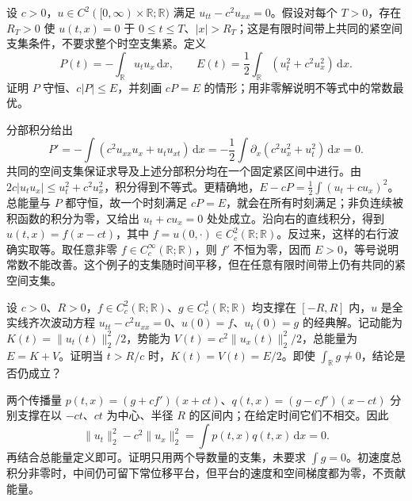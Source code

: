 \begin{exercise}\label{b2:ex:09-momentum}
设 \(c>0\)，\(u\in C^2([0,\infty)\times\mathbb R;\mathbb R)\) 满足 \(u_{tt}-c^2u_{xx}=0\)。假设对每个 \(T>0\)，存在 \(R_T>0\) 使 \(u(t,x)=0\) 于 \(0\leq t\leq T\)、\(|x|>R_T\)；这是有限时间带上共同的紧空间支集条件，不要求整个时空支集紧。定义
\[
 P(t)=-\int_{\mathbb R}u_tu_x\,\mathrm{d}x,\qquad
 E(t)=\frac12\int_{\mathbb R}(u_t^2+c^2u_x^2)\,\mathrm{d}x.
\]
证明 \(P\) 守恒、\(c|P|\leq E\)，并刻画 \(cP=E\) 的情形；用非零解说明不等式中的常数最优。
\end{exercise}
\begin{solution}
分部积分给出
\[
 P'=-\int(c^2u_{xx}u_x+u_tu_{xt})\,\mathrm{d}x
 =-\dfrac12\int\partial_x(c^2u_x^2+u_t^2)\,\mathrm{d}x=0.
\]
共同的空间支集保证求导及上述分部积分均在一个固定紧区间中进行。由 \(2c|u_tu_x|\leq u_t^2+c^2u_x^2\)，积分得到不等式。更精确地，\(E-cP=\frac12\int(u_t+cu_x)^2\)。总能量与 \(P\) 都守恒，故一个时刻满足 \(cP=E\)，就会在所有时刻满足；非负连续被积函数的积分为零，又给出 \(u_t+cu_x=0\) 处处成立。沿向右的直线积分，得到 \(u(t,x)=f(x-ct)\)，其中 \(f=u(0,\cdot)\in C_c^2(\mathbb R;\mathbb R)\)。反过来，这样的右行波确实取等。取任意非零 \(f\in C_c^\infty(\mathbb R;\mathbb R)\)，则 \(f'\) 不恒为零，因而 \(E>0\)，等号说明常数不能改善。这个例子的支集随时间平移，但在任意有限时间带上仍有共同的紧空间支集。
\end{solution}

\begin{exercise}\label{b2:ex:09-equipartition}
设 \(c>0\)、\(R>0\)，\(f\in C_c^2(\mathbb R;\mathbb R)\)、\(g\in C_c^1(\mathbb R;\mathbb R)\) 均支撑在 \([-R,R]\) 内，\(u\) 是全实线齐次波动方程 \(u_{tt}-c^2u_{xx}=0\)、\(u(0)=f\)、\(u_t(0)=g\) 的经典解。记动能为 \(K(t)=\|u_t(t)\|_2^2/2\)，势能为 \(V(t)=c^2\|u_x(t)\|_2^2/2\)，总能量为 \(E=K+V\)。证明当 \(t>R/c\) 时，\(K(t)=V(t)=E/2\)。即使 \(\int_{\mathbb R}g\ne0\)，结论是否仍成立？
\end{exercise}
\begin{solution}
两个传播量 \(p(t,x)=(g+cf')(x+ct)\)、\(q(t,x)=(g-cf')(x-ct)\) 分别支撑在以 \(-ct\)、\(ct\) 为中心、半径 \(R\) 的区间内；在给定时间它们不相交。因此
\[
 \|u_t\|_2^2-c^2\|u_x\|_2^2=\int p(t,x)q(t,x)\,\mathrm{d}x=0.
\]
再结合总能量定义即可。证明只用两个导数量的支集，未要求 \(\int g=0\)。初速度总积分非零时，中间仍可留下常位移平台，但平台的速度和空间梯度都为零，不贡献能量。
\end{solution}


